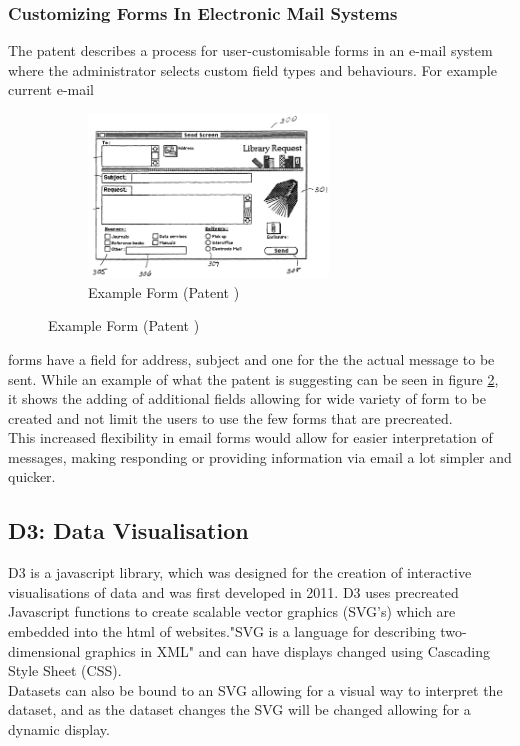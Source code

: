 \documentclass[12pt]{article}  %
\begin{document}
\subsubsection{Customizing Forms In Electronic Mail Systems}
\noindent
The patent  \cite{holt_customizing_2006} describes a process for user-customisable forms in an e-mail system where the administrator selects custom field types and behaviours.  For example current e-mail

\begin{figure}
\vspace*{-\baselineskip}
\begin{figure}[H]
  \includegraphics[width=0.7\textwidth]{images/emailform.png}
	\caption{Example Form (Patent \cite{holt_customizing_2006})}
	\label{fig:emailform}
\end{figure}
\end{figure}

\noindent
forms have a field for address, subject and one for the the actual message to be sent. While an example of what the patent is suggesting can be seen in figure \ref{fig:emailform}, it shows the adding of additional fields allowing for wide variety of form to be created and not limit the  users to use the few forms that are precreated.\\
This increased flexibility in email forms would allow for easier  interpretation of messages, making responding or providing information via email a lot simpler and quicker.


\subsection{D3: Data Visualisation}
D3 \cite{bostock_d3.js_????} is a javascript library, which was designed for the creation of interactive visualisations of data and was first developed in 2011. D3 uses precreated Javascript functions to create scalable vector graphics (SVG's) which are embedded into the html of websites."SVG is a language for describing two-dimensional graphics in XML"\cite{ferraiolo_scalable_2000} and can have displays changed  using Cascading Style Sheet (CSS).  \\
Datasets can also be bound to an SVG allowing for a visual way to interpret the dataset, and as the dataset changes the SVG will be changed allowing for a dynamic display.  
\end{document}
